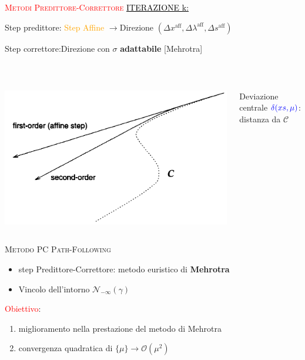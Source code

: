 \begin{frame}{\textsc{\LARGE \textcolor{red}{Metodi Predittore-Correttore}}}
\pause
\textcolor{black}{\underline{ITERAZIONE k:}}
\pause
{}
\setcounter{elenco}{0}
\begin{list}{}{\setlength{\itemsep}{0.6cm}}
	\item Step predittore: \textcolor{orange}{Step Affine} $\rightarrow$\pause Direzione $(\Delta x^{\text{aff}}, \Delta \lambda^{\text{aff}},\Delta s^{\text{aff}})$
	\pause
	\item Step correttore:\pause \;\;Direzione con $\sigma$ \textbf{adattabile} [Mehrotra]
	\end{list}
\\[1 cm]
\pause
\begin{columns}
	\begin{column}{0.4\textwidth}
	\includegraphics[width=\columnwidth]{MEH.PNG}
\end{column}
\begin{column}{0.4\textwidth}
	Deviazione centrale $\textcolor{blue}{\delta(xs, \mu)}$: distanza da $\mathcal{C}$
\end{column}
\end{columns}
\end{frame}


\begin{frame}[t]{\textsc{\LARGE \textcolor{sapphire}{Metodo PC Path-Following}}}
\begin{itemize}
\item step Predittore-Correttore: metodo euristico di \textbf{Mehrotra}
\item Vincolo dell'intorno $\mathcal{N}_{-\infty}(\gamma)$
\end{itemize}
\pause
\textcolor{red}{Obiettivo}: 
\begin{enumerate}
	\item miglioramento nella prestazione del metodo di Mehrotra
	\item convergenza quadratica di $\{\mu\}\rightarrow \mathcal{O}(\mu^{2})$
\end{enumerate}
\end{frame}

